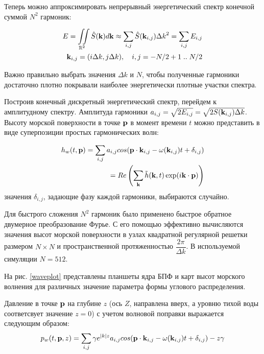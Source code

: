Теперь можно аппроксимировать непрерывный энергетический спектр конечной суммой $N^2$ гармоник:

\begin{equation}
\begin{split}
E = \iint\limits_{\mathbb{R}^2} \hat{S}(\mathbf{k})d\mathbf{k}
    \approx \sum_{i,j} \hat{S}(\mathbf{k}_{i,j}) {\Delta k}^2 
    = \sum_{i,j} E_{i,j}\\
\mathbf{k}_{i,j} = (i\Delta k, j\Delta k), \quad i,j = -N/2+1 \; .. \; N/2 
\end{split}
\end{equation}

Важно правильно выбрать значения $\Delta k$ и $N$, чтобы полученные гармоники достаточно плотно покрывали наиболее энергетически плотные участки спектра.

Построив конечный дискретный энергетический спектр, перейдем к амплитудному спектру. Амплитуда гармоники $a_{i,j} = \sqrt{2E_{i,j}} = \sqrt{2S(\mathbf{k}_{i,j})\Delta k}$. Высоту морской поверхности в точке $\mathbf{p}$ в момент времени $t$ можно представить в виде суперпозиции простых гармонических волн:

\begin{equation}
\label{wave_height}
\begin{split}
h_w(t,\mathbf{p}) = \sum_{i,j} a_{i,j}cos(\mathbf{p}\cdot \mathbf{k}_{i,j} - \omega(\mathbf{k}_{i,j})t + \delta_{i,j}) \\
= Re\left( \sum_{\mathbf{k}} \tilde{h}(\mathbf{k}, t)
 \exp(i\mathbf{k} \cdot \mathbf{p}) \right)
\end{split}
\end{equation}
значения $\delta_{i,j}$, задающие фазу каждой гармоники, выбираются случайно.

Для быстрого сложения $N^2$ гармоник было применено быстрое обратное двумерное преобразование Фурье. С его помощью эффективно вычисляются значения высот морской поверхности в узлах квадратной регулярной решетки размером $N \times N$ и пространственной протяженностью $\dfrac{2\pi}{\Delta k}$. В используемой симуляции $N = 512$.

На рис. \ref{waveplot} представлены планшеты ядра БПФ и карт высот морского волнения для различных значение параметра формы углового распределения.

Давление в точке $\mathbf{p}$ на глубине $z$ (ось $Z$, направлена вверх, а уровню тихой воды соответсвует значение $z=0$) с учетом волновой поправки выражается следующим образом:
\begin{equation}
\label{wave_height}
	p_w(t,\mathbf{p},z) = \sum_{i,j}
		\gamma e^{\lvert k\rvert z} 
		a_{i,j}cos(\mathbf{p}\cdot \mathbf{k}_{i,j} 
		- \omega(\mathbf{k}_{i,j})t 
		+ \delta_{i,j}) - z \gamma
\end{equation}

